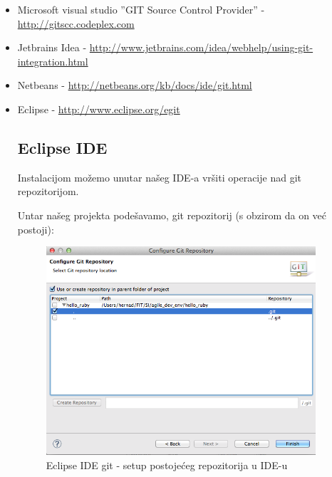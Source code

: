 \documentclass[times, utf8, seminar]{fit}
\begin{document}
\begin{itemize}
  \item Microsoft visual studio ''GIT Source Control Provider'' - \url{http://gitscc.codeplex.com}
  \item Jetbrains Idea - \url{http://www.jetbrains.com/idea/webhelp/using-git-integration.html}
  \item Netbeans - \url{http://netbeans.org/kb/docs/ide/git.html}
  \item Eclipse - \url{http://www.eclipse.org/egit}

\subsection{Eclipse IDE}

Instalacijom \href{http://www.vogella.com/articles/EGit/article.html}{\color{blue}{EGit plugin-a}} možemo unutar našeg IDE-a vršiti operacije nad git repozitorijom.

Untar našeg projekta podešavamo, git repozitorij (s obzirom da on već postoji):
\begin{figure}[H]
\centering
\includegraphics[width=10cm]{img/eclipse_git_01.png}
\caption{Eclipse IDE git - setup postojećeg repozitorija u IDE-u}
\end{figure}


\end{itemize}
\end{document}
